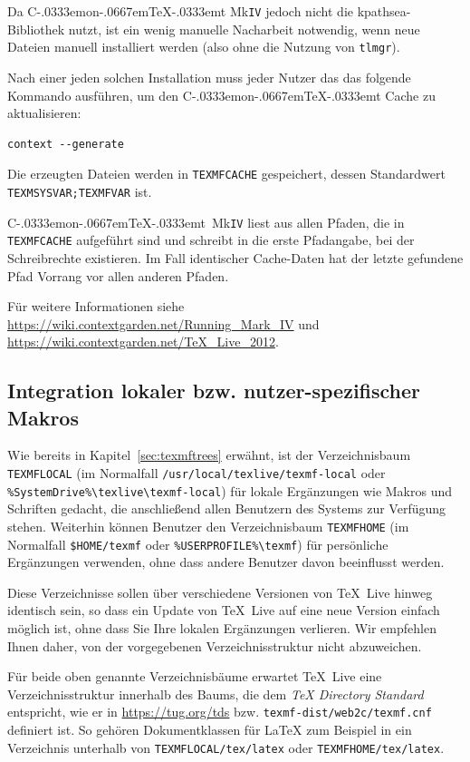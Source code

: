 \documentclass[12pt,ngerman,a4paper,fullparskip]{report}
\newcommand{\TL}{\TeX\ Live\xspace}
\newcommand{\acro}[1]{\texttt{#1}}
\newcommand{\code}[1]{\texttt{#1}}
\newcommand{\filename}[1]{\texttt{#1}}
\newcommand{\dirname}[1]{\texttt{#1}}
\newcommand\ConTeXt{C\kern-.0333emon\-\kern-.0667em\TeX\kern-.0333emt}
\begin{document}
Da \ConTeXt{} Mk\acro{IV} jedoch nicht die kpathsea-Bibliothek nutzt, ist
ein wenig manuelle Nacharbeit notwendig, wenn neue Dateien manuell installiert werden (also ohne die Nutzung von \verb+tlmgr+).

Nach einer jeden solchen Installation muss jeder Nutzer das das folgende Kommando ausführen, um den \ConTeXt{} Cache zu aktualisieren:

\begin{verbatim}
context --generate
\end{verbatim}

Die erzeugten Dateien werden in \code{TEXMFCACHE} gespeichert, dessen Standardwert \verb+TEXMSYSVAR;TEXMFVAR+ ist. 

\ConTeXt\ Mk\acro{IV} liest aus allen Pfaden, die in \verb+TEXMFCACHE+ aufgeführt sind und schreibt in die erste Pfadangabe, bei der Schreibrechte existieren. Im Fall identischer Cache-Daten hat der letzte gefundene Pfad Vorrang vor allen anderen Pfaden.

Für weitere Informationen siehe
\url{https://wiki.contextgarden.net/Running_Mark_IV} und
\url{https://wiki.contextgarden.net/TeX_Live_2012}.

\subsection{Integration lokaler bzw. nutzer-spezifischer Makros}
\label{sec:local-personal-macros}

Wie bereits in Kapitel~\ref{sec:texmftrees} erwähnt, ist der Verzeichnisbaum \dirname{TEXMFLOCAL} (im Normalfall \dirname{/usr/local/texlive/texmf-local} oder \verb|%SystemDrive%\texlive\|\newline \verb|texmf-local|) für lokale Ergänzungen wie Makros und Schriften gedacht, die anschließend allen Benutzern des Systems zur Verfügung stehen. Weiterhin können Benutzer den Verzeichnisbaum \dirname{TEXMFHOME} (im Normalfall \dirname{\$HOME/texmf} oder \verb|%USERPROFILE%\texmf|) für persönliche Ergänzungen verwenden, ohne dass andere Benutzer davon beeinflusst werden.

Diese Verzeichnisse sollen über verschiedene Versionen von \TL hinweg identisch sein, so dass ein Update von \TL auf eine neue Version einfach möglich ist, ohne dass Sie Ihre lokalen Ergänzungen verlieren. Wir empfehlen Ihnen daher, von der vorgegebenen Verzeichnisstruktur nicht abzuweichen.

Für beide oben genannte Verzeichnisbäume erwartet \TL eine Verzeichnisstruktur innerhalb des Baums, die dem \emph{\TeX{} Directory Standard} entspricht, wie er in \url{https://tug.org/tds} bzw. \filename{texmf-dist/web2c/texmf.cnf} definiert ist.
So gehören Dokumentklassen für \LaTeX{} zum Beispiel in ein Verzeichnis
unterhalb von \dirname{TEXMFLOCAL/tex/latex} oder \dirname{TEXMFHOME/tex/latex}.
\end{document}
